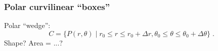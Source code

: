 \begin{frame}
 \frametitle{Polar curvilinear ``boxes''}

 Polar ``wedge'':
$$C  = \{ P(r,\theta) \; | \;r_0 \leqslant
r \leqslant r_0+\Delta r,  \theta_0 \leqslant \theta
\leqslant \theta_0+\Delta \theta\} \; .$$
%
Shape? \pause Area = ...?

\end{frame}